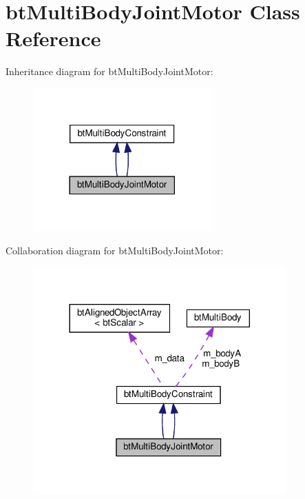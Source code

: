\hypertarget{classbtMultiBodyJointMotor}{}\section{bt\+Multi\+Body\+Joint\+Motor Class Reference}
\label{classbtMultiBodyJointMotor}


Inheritance diagram for bt\+Multi\+Body\+Joint\+Motor\+:
\nopagebreak
\begin{figure}[H]
\begin{center}
\leavevmode
\includegraphics[width=194pt]{classbtMultiBodyJointMotor__inherit__graph}
\end{center}
\end{figure}


Collaboration diagram for bt\+Multi\+Body\+Joint\+Motor\+:
\nopagebreak
\begin{figure}[H]
\begin{center}
\leavevmode
\includegraphics[width=276pt]{classbtMultiBodyJointMotor__coll__graph}
\end{center}
\end{figure}
